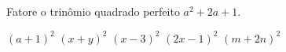 Fatore o trinômio quadrado perfeito $a^2+2a+1$.

$(a+1)^2$
$(x+y)^2$
$(x-3)^2$
$(2x-1)^2$
$(m+2n)^2$


